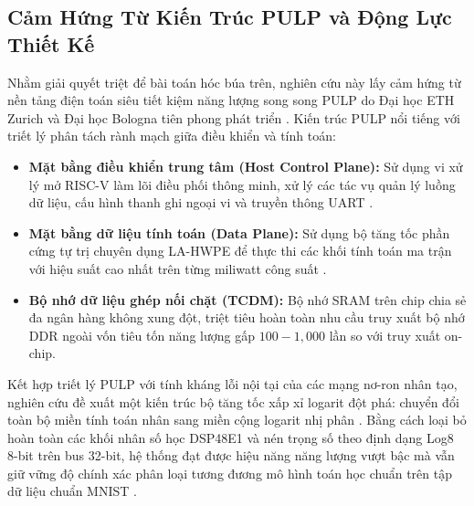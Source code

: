 \documentclass[conference]{IEEEtran}
\begin{document}
\subsection{Cảm Hứng Từ Kiến Trúc PULP và Động Lực Thiết Kế}
\hspace*{1em} Nhằm giải quyết triệt để bài toán hóc búa trên, nghiên cứu này lấy cảm hứng từ nền tảng điện toán siêu tiết kiệm năng lượng song song PULP do Đại học ETH Zurich và Đại học Bologna tiên phong phát triển \cite{pulp2019, conti2015}. Kiến trúc PULP nổi tiếng với triết lý phân tách rành mạch giữa điều khiển và tính toán:
\begin{itemize}
    \item \textbf{Mặt bằng điều khiển trung tâm (Host Control Plane):} Sử dụng vi xử lý mở RISC-V làm lõi điều phối thông minh, xử lý các tác vụ quản lý luồng dữ liệu, cấu hình thanh ghi ngoại vi và truyền thông UART \cite{waterman2014}.
    \item \textbf{Mặt bằng dữ liệu tính toán (Data Plane):} Sử dụng bộ tăng tốc phần cứng tự trị chuyên dụng LA-HWPE để thực thi các khối tính toán ma trận với hiệu suất cao nhất trên từng miliwatt công suất \cite{conti2015}.
    \item \textbf{Bộ nhớ dữ liệu ghép nối chặt (TCDM):} Bộ nhớ SRAM trên chip chia sẻ đa ngân hàng không xung đột, triệt tiêu hoàn toàn nhu cầu truy xuất bộ nhớ DDR ngoài vốn tiêu tốn năng lượng gấp $100 - 1,000$ lần so với truy xuất on-chip.
\end{itemize}

Kết hợp triết lý PULP với tính kháng lỗi nội tại của các mạng nơ-ron nhân tạo, nghiên cứu đề xuất một kiến trúc bộ tăng tốc xấp xỉ logarit đột phá: chuyển đổi toàn bộ miền tính toán nhân sang miền cộng logarit nhị phân \cite{mitchell1962, guo2021}. Bằng cách loại bỏ hoàn toàn các khối nhân số học DSP48E1 và nén trọng số theo định dạng Log8 8-bit trên bus 32-bit, hệ thống đạt được hiệu năng năng lượng vượt bậc mà vẫn giữ vững độ chính xác phân loại tương đương mô hình toán học chuẩn trên tập dữ liệu chuẩn MNIST \cite{lecun1998}.
\end{document}
